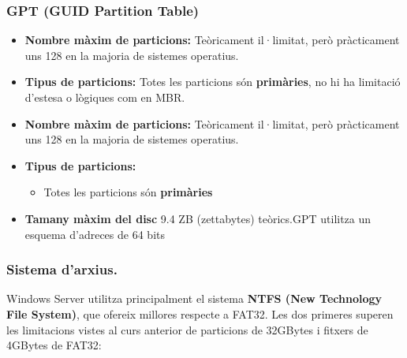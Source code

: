 \documentclass[
  a4paper,
]{article}
\providecommand{\tightlist}{%
  \setlength{\itemsep}{0pt}\setlength{\parskip}{0pt}}
\begin{document}
\subsubsection{GPT (GUID Partition
Table)}\label{gpt-guid-partition-table}

\begin{itemize}
\tightlist
\item
  \textbf{Nombre màxim de particions:} Teòricament il·limitat, però
  pràcticament uns 128 en la majoria de sistemes operatius.
\item
  \textbf{Tipus de particions:} Totes les particions són
  \textbf{primàries}, no hi ha limitació d'estesa o lògiques com en MBR.
\item
  \textbf{Nombre màxim de particions:} Teòricament il·limitat, però
  pràcticament uns 128 en la majoria de sistemes operatius.
\item
  \textbf{Tipus de particions:}

  \begin{itemize}
  \tightlist
  \item
    Totes les particions són \textbf{primàries}
  \end{itemize}
\item
  \textbf{Tamany màxim del disc} 9.4 ZB (zettabytes) teòrics.GPT
  utilitza un esquema d'adreces de 64 bits
\end{itemize}

\subsubsection{Sistema d'arxius.}\label{sistema-darxius.}

Windows Server utilitza principalment el sistema \textbf{NTFS (New
Technology File System)}, que ofereix millores respecte a FAT32. Les dos
primeres superen les limitacions vistes al curs anterior de particions
de 32GBytes i fitxers de 4GBytes de FAT32:
\end{document}

